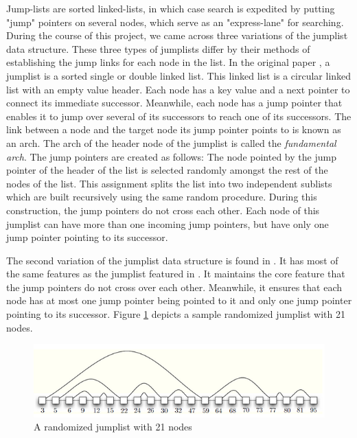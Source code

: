 \documentclass[oribibl]{llncs}
\begin{document}
Jump-lists \cite{jump_list} are sorted linked-lists, in which case search is expedited by putting "jump" pointers on several nodes, which serve as an "express-lane" for searching. During the course of this project, we came across three variations of the jumplist data structure. These three types of jumplists differ by their methods of establishing the jump links for each node in the list. In the original paper \cite{jump_list}, a jumplist is a sorted single or double linked list. This linked list is a circular linked list with an empty value header. Each node has a key value and a next pointer to connect its immediate successor. Meanwhile, each node has a jump pointer that enables it to jump over several of its successors to reach one of its successors. The link between a node and the target node its jump pointer points to is known as an arch. The arch of the header node of the jumplist is called the {\it fundamental arch}. The jump pointers are created as follows: The node pointed by the jump pointer of the header of the list is selected randomly amongst the rest of the nodes of the list. This assignment splits the list into two independent sublists which are built recursively using the same random procedure. During this construction, the jump pointers do not cross each other. Each node of this jumplist can have more than one incoming jump pointers, but have only one jump pointer pointing to its successor.

The second variation of the jumplist data structure is found in \cite{skip_lift}. It has most of the same features as the jumplist featured in \cite{jump_list}. It maintains the core feature that the jump pointers do not cross over each other. Meanwhile, it ensures that each node has at most one jump pointer being pointed to it and only one jump pointer pointing to its successor. Figure \ref{fig:jumplist} depicts a sample randomized jumplist with 21 nodes.


\begin{figure}[here]
\center
\includegraphics[width=15cm]{images/jumplist}
\caption{A randomized jumplist with 21 nodes}
\label{fig:jumplist}
\end{figure}
\end{document}
